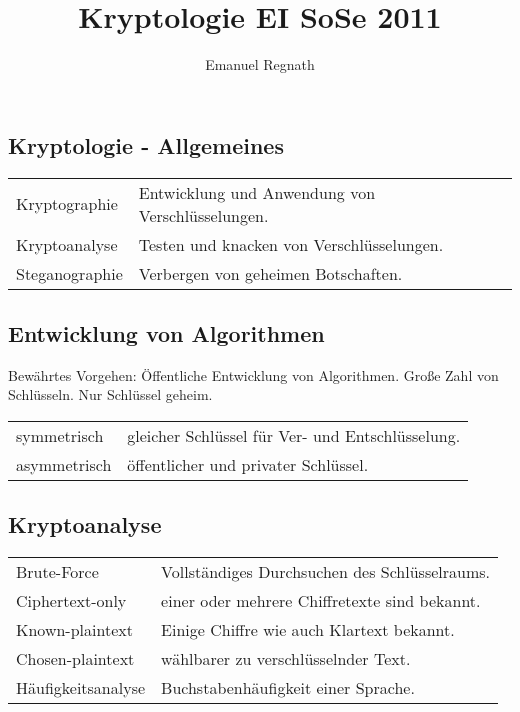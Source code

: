 \documentclass[fs]{latex4ei}
\title{Kryptologie EI SoSe 2011}
\author{Emanuel Regnath}
\begin{document}
\begin{multicols}{4}




\section{Kryptologie - Allgemeines}
	\begin{tabular}{@{}ll}
	Kryptographie & Entwicklung und Anwendung von Verschlüsselungen.\\
	Kryptoanalyse & Testen und knacken von Verschlüsselungen.\\
	Steganographie & Verbergen von geheimen Botschaften.\\ 
	\end{tabular}

	\subsection{Entwicklung von Algorithmen}
	Bewährtes Vorgehen: Öffentliche Entwicklung von Algorithmen. Große Zahl von Schlüsseln. Nur Schlüssel geheim.\\
	\begin{tabular}{ll}
		symmetrisch & gleicher Schlüssel für Ver- und Entschlüsselung.\\
		asymmetrisch & öffentlicher und privater Schlüssel.
	\end{tabular}
	
	\subsection{Kryptoanalyse}
	\begin{tabular}{ll}
		Brute-Force & Vollständiges Durchsuchen des Schlüsselraums.\\
		Ciphertext-only & einer oder mehrere Chiffretexte sind bekannt.\\
		Known-plaintext & Einige Chiffre wie auch Klartext bekannt.\\
		Chosen-plaintext & wählbarer zu verschlüsselnder Text.\\
		Häufigkeitsanalyse & Buchstabenhäufigkeit einer Sprache.
	\end{tabular}



\end{multicols}
\end{document}
